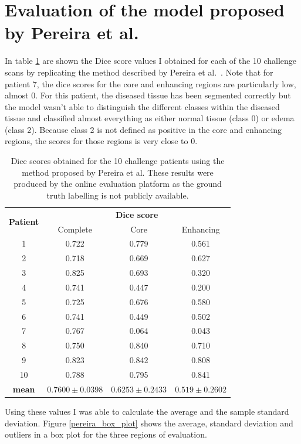 \documentclass[12pt,a4paper,twoside,openright]{report}
\begin{document}
\section{Evaluation of the model proposed by Pereira et al.}
In table \ref{table:pereira_dice_results} are shown the Dice score values I obtained for each of the 10 challenge scans by replicating the method described by Pereira et al.\ \cite{pereira}. Note that for patient 7, the dice scores for the core and enhancing regions are particularly low, almost 0. For this patient, the diseased tissue has been segmented correctly but the model wasn't able to distinguish the different classes within the diseased tissue and classified almost everything as either normal tissue (class 0) or edema (class 2). Because class 2 is not defined as positive in the core and enhancing regions, the scores for those regions is very close to 0.
\begin{table}[h]
\centering	
\label{table:pereira_dice_results}
\begin{tabular}{ c | c c c} 
\multirow{2}{*}{\textbf{Patient}} & \multicolumn{3}{c}{\textbf{Dice score}} \\
 & Complete & Core & Enhancing \\
 \hline
1 &	0.722 & 0.779 & 0.561\\
2 & 0.718 & 0.669 & 0.627 \\
3 & 0.825 & 0.693 & 0.320 \\
4 & 0.741 & 0.447 & 0.200 \\
5 & 0.725 & 0.676 & 0.580 \\
6 & 0.741 & 0.449 & 0.502 \\
7 & 0.767 & 0.064 & 0.043 \\
8 & 0.750 & 0.840 & 0.710 \\
9 & 0.823 & 0.842 & 0.808 \\
10 & 0.788 & 0.795 & 0.841 \\
\hline
\rule{0pt}{3ex}    
\textbf{mean} & $0.7600 \pm 0.0398$ & 	$0.6253 \pm 0.2433$ & $0.519  \pm 0.2602$ \\
\end{tabular}
\caption{Dice scores obtained for the 10 challenge patients using the method proposed by Pereira et al. These results were produced by the online evaluation platform as the ground truth labelling is not publicly available.}
\end{table}

Using these values I was able to calculate the average and the sample standard deviation. Figure \ref{pereira_box_plot} shows the average, standard deviation and outliers in a box plot for the three regions of evaluation.
\end{document}
